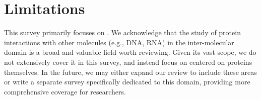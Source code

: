 \newpage
\section*{Limitations}

This survey primarily focuses on \proteinllms. We acknowledge that the study of protein interactions with other molecules (e.g., DNA, RNA) in the inter-molecular domain is a broad and valuable field worth reviewing. Given its vast scope, we do not extensively cover it in this survey, and instead focus on \proteinllms centered on proteins themselves. In the future, we may either expand our review to include these areas or write a separate survey specifically dedicated to this domain, providing more comprehensive coverage for researchers.
